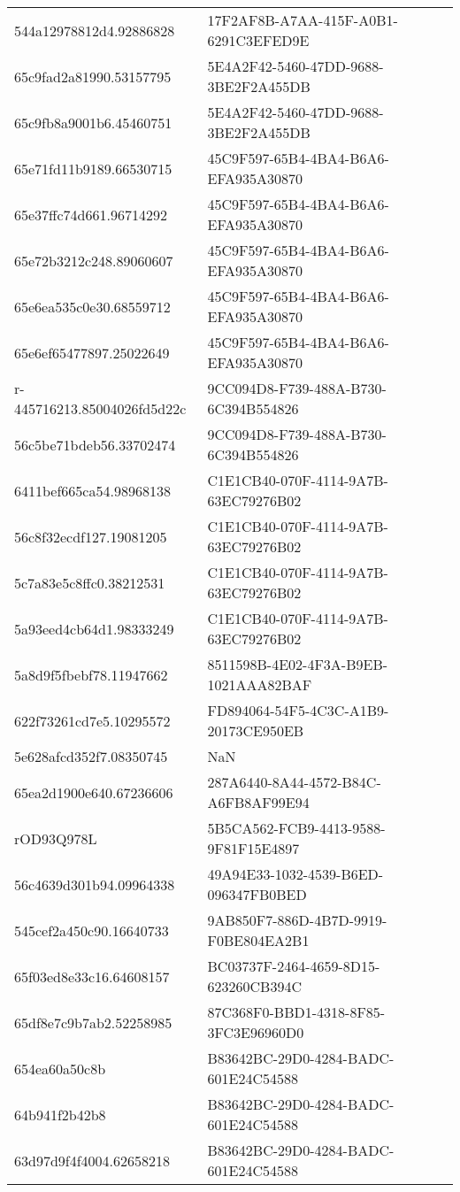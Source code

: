 \begin{tabular}{ll}
544a12978812d4.92886828 & 17F2AF8B-A7AA-415F-A0B1-6291C3EFED9E \\
65c9fad2a81990.53157795 & 5E4A2F42-5460-47DD-9688-3BE2F2A455DB \\
65c9fb8a9001b6.45460751 & 5E4A2F42-5460-47DD-9688-3BE2F2A455DB \\
65e71fd11b9189.66530715 & 45C9F597-65B4-4BA4-B6A6-EFA935A30870 \\
65e37ffc74d661.96714292 & 45C9F597-65B4-4BA4-B6A6-EFA935A30870 \\
65e72b3212c248.89060607 & 45C9F597-65B4-4BA4-B6A6-EFA935A30870 \\
65e6ea535c0e30.68559712 & 45C9F597-65B4-4BA4-B6A6-EFA935A30870 \\
65e6ef65477897.25022649 & 45C9F597-65B4-4BA4-B6A6-EFA935A30870 \\
r-445716213.85004026fd5d22c & 9CC094D8-F739-488A-B730-6C394B554826 \\
56c5be71bdeb56.33702474 & 9CC094D8-F739-488A-B730-6C394B554826 \\
6411bef665ca54.98968138 & C1E1CB40-070F-4114-9A7B-63EC79276B02 \\
56c8f32ecdf127.19081205 & C1E1CB40-070F-4114-9A7B-63EC79276B02 \\
5c7a83e5c8ffc0.38212531 & C1E1CB40-070F-4114-9A7B-63EC79276B02 \\
5a93eed4cb64d1.98333249 & C1E1CB40-070F-4114-9A7B-63EC79276B02 \\
5a8d9f5fbebf78.11947662 & 8511598B-4E02-4F3A-B9EB-1021AAA82BAF \\
622f73261cd7e5.10295572 & FD894064-54F5-4C3C-A1B9-20173CE950EB \\
5e628afcd352f7.08350745 & NaN \\
65ea2d1900e640.67236606 & 287A6440-8A44-4572-B84C-A6FB8AF99E94 \\
rOD93Q978L & 5B5CA562-FCB9-4413-9588-9F81F15E4897 \\
56c4639d301b94.09964338 & 49A94E33-1032-4539-B6ED-096347FB0BED \\
545cef2a450c90.16640733 & 9AB850F7-886D-4B7D-9919-F0BE804EA2B1 \\
65f03ed8e33c16.64608157 & BC03737F-2464-4659-8D15-623260CB394C \\
65df8e7c9b7ab2.52258985 & 87C368F0-BBD1-4318-8F85-3FC3E96960D0 \\
654ea60a50c8b & B83642BC-29D0-4284-BADC-601E24C54588 \\
64b941f2b42b8 & B83642BC-29D0-4284-BADC-601E24C54588 \\
63d97d9f4f4004.62658218 & B83642BC-29D0-4284-BADC-601E24C54588 \\

\end{tabular}
